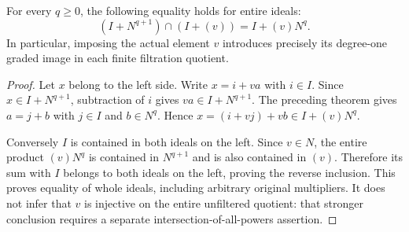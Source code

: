 \begin{theorem}
\label{hir:regular-symbol-whole-principal-intersection}
\leanok
For every $q\geq0$, the following equality holds for entire ideals:
\[
 (I+N^{q+1})\cap(I+(v))=I+(v)N^q.
\]
In particular, imposing the actual element $v$ introduces precisely
its degree-one graded image in each finite filtration quotient.
\end{theorem}
\begin{proof}
Let $x$ belong to the left side. Write $x=i+va$ with $i\in I$.
Since $x\in I+N^{q+1}$, subtraction of $i$ gives
$va\in I+N^{q+1}$. The preceding theorem gives $a=j+b$ with
$j\in I$ and $b\in N^q$. Hence
$x=(i+vj)+vb\in I+(v)N^q$.

Conversely $I$ is contained in both ideals on the left.
Since $v\in N$, the entire product $(v)N^q$ is contained in
$N^{q+1}$ and is also contained in $(v)$. Therefore its sum with
$I$ belongs to both ideals on the left, proving the reverse inclusion.
This proves equality of whole ideals, including arbitrary original
multipliers. It does not infer that $v$ is injective on the entire
unfiltered quotient: that stronger conclusion requires a separate
intersection-of-all-powers assertion.
\end{proof}
